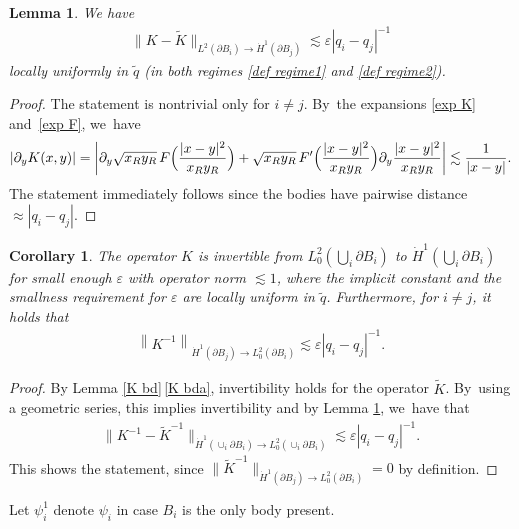 \documentclass[10pt]{amsart}
\let\epsilon\varepsilon
\newtheorem{corollary}[theorem]{Corollary}
\newtheorem{lemma}[theorem]{Lemma}
\theoremstyle{definition}
\newcommand\norm[1]{\left\lVert #1\right\rVert}
\newcommand\anorm[1]{\lVert #1\rVert}
\newcommand\bnorm[1]{\bigl\lVert #1\bigr\rVert}
\newcommand\eq{=}
\let\de\partial
\let\eps\epsilon
\begin{document}
\begin{lemma}\label{comp tilde K}
We have
\begin{align*}
\anorm{K-\tilde{K}}_{L^2(\de B_i)\to \dot{H}^1(\de B_j)}\lesssim \eps|q_i-q_j|^{-1}
\end{align*}
locally uniformly in $\tilde{q}$ (in both regimes \eqref{def regime1} and \eqref{def regime2}).
\end{lemma}
\begin{proof}
The statement is nontrivial only for $i\neq j$. By~the expansions \eqref{exp K} and~\eqref{exp F}, we~have
\begin{align*}
|\de_yK(x,y)|\eq\left|\de_y\sqrt{x_Ry_R}\,F\Bigl(\frac{|x-y|^2}{x_Ry_R}\Bigr)+\sqrt{x_Ry_R}\,F'\Bigl(\frac{|x-y|^2}{x_Ry_R}\Bigr)\de_y\frac{|x-y|^2}{x_Ry_R}\right|\lesssim \frac{1}{|x-y|}.
\end{align*}
The statement immediately follows since the bodies have pairwise distance \hbox{$\approx |q_i-q_j|$}.
\end{proof}

\begin{corollary}\label{K inv mult}
The operator $K$ is invertible from $L_0^2(\bigcup_i \de B_i)$ to $\dot{H}^1(\bigcup_i \de B_i)$ for small enough $\eps$ with operator norm $\lesssim 1$, where the implicit constant and the smallness requirement for $\eps$ are locally uniform in $\tilde{q}$. Furthermore, for $i\neq j$, it holds that
\begin{align}
\norm{K^{-1}}_{\dot{H}^1(\de B_j)\to L_0^2(\de B_i)}\lesssim \eps|q_i-q_j|^{-1}.\label{double bd}
\end{align}
\end{corollary}
\begin{proof}
By Lemma \ref{K bd}\,\eqref{K bda}, invertibility holds for the operator $\tilde{K}$. By~using \eg a geometric series, this implies invertibility and by Lemma \ref{comp tilde K}, we~have that
\begin{align*}
\bnorm{K^{-1}-\tilde{K}^{-1}}_{\dot{H}^1(\cup_i\de B_i)\to L_0^2(\cup_i\de B_i)}\lesssim \eps|q_i-q_j|^{-1}.
\end{align*}
This shows the statement, since $\anorm{\tilde{K}^{-1}}_{\dot{H}^1(\de B_j)\to L_0^2(\de B_i)}=0$ by definition.
\end{proof}

Let $\psi_i^1$ denote $\psi_i$ in case $B_i$ is the only body present.
\end{document}
